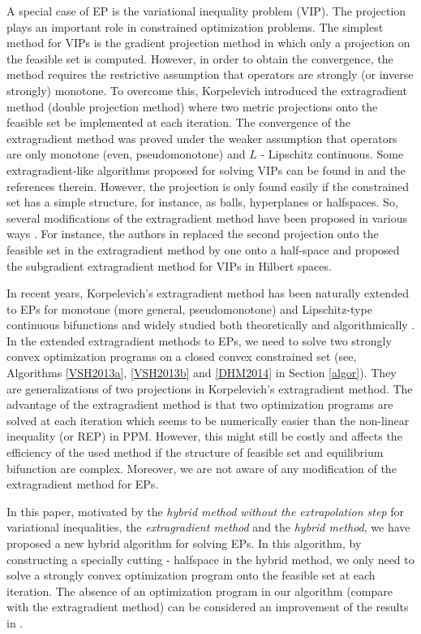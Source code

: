 \documentclass{aims}
\theoremstyle{definition}
\begin{document}
A special case of EP is the variational inequality problem (VIP). The projection plays an important role in constrained optimization 
problems. The simplest method for VIPs is the gradient projection method in which only a projection on the feasible set is computed. However, in order to 
obtain the convergence, the method requires the restrictive assumption that operators are strongly (or inverse strongly) monotone. To overcome this, 
Korpelevich \cite{K1976} introduced the extragradient method (double projection method) where two metric projections onto the feasible set be implemented 
at each iteration. The convergence of the extragradient method was proved under the weaker assumption that operators are only monotone 
(even, pseudomonotone) and $L$ - Lipschitz continuous. Some extragradient-like algorithms proposed for solving VIPs can 
be found in \cite{CHW2010,CY2007,HYY2004,NT2006a,NT2006b} and the references therein.  However, the projection is only found easily if the 
constrained set has a simple structure, for instance, as balls, hyperplanes or halfspaces. So, several modifications of the extragradient method have been 
proposed in various ways \cite{CGR2011a,CGR2011,GR1984,MS2015}. For instance, the authors 
in \cite{CGR2011a} replaced the second projection onto the feasible set in the extragradient method by 
one onto a half-space and proposed the subgradient extragradient method for VIPs in Hilbert spaces.

In recent years, Korpelevich's extragradient method has been naturally
extended to EPs for monotone (more general, pseudomonotone) and Lipschitz-type continuous bifunctions and widely studied both theoretically and 
algorithmically \cite{DHM2014,H2015a,VSH2013,NSNN2015,QMH2008,SVH2011,VSN2012}. In the extended extragradient methods 
to EPs, we need to solve two strongly convex optimization programs on a closed convex constrained set (see, Algorithms 
\ref{VSH2013a}, \ref{VSH2013b} and \ref{DHM2014} in Section \ref{algor}). They are generalizations of two projections in Korpelevich's 
extragradient method. The advantage of the extragradient method is that two optimization programs are solved at each iteration which seems to be 
numerically easier than the non-linear inequality (or REP) in PPM. However, this might still be costly and affects the efficiency of the used method 
if the structure of feasible set and equilibrium bifunction are complex. Moreover, we are not aware of any modification of the extragradient method 
for EPs.

In this paper, motivated by the \textit{hybrid method without the extrapolation step} \cite{MS2015} for variational inequalities, the \textit{extragradient 
method} \cite{QMH2008} and the \textit{hybrid method}, we have proposed a new hybrid algorithm 
for solving EPs. In this algorithm, by constructing a specially cutting - halfspace in the hybrid method, we only need to solve a strongly convex optimization program 
onto the feasible set at each iteration. The absence of an optimization program in our algorithm (compare with the extragradient method) can be considered an 
improvement of the results in \cite{DHM2014,H2015a,LSV2011,VSH2013,NSNN2015,SVH2011,VSN2012}.
\end{document}
